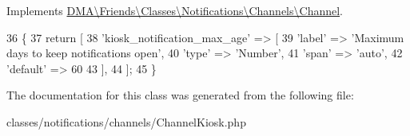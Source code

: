 Implements \hyperlink{interfaceDMA_1_1Friends_1_1Classes_1_1Notifications_1_1Channels_1_1Channel_aa473115fa58a6fa5f57a9069f23dd771}{D\+M\+A\textbackslash{}\+Friends\textbackslash{}\+Classes\textbackslash{}\+Notifications\textbackslash{}\+Channels\textbackslash{}\+Channel}.


\begin{DoxyCode}
36     \{
37         \textcolor{keywordflow}{return} [
38             \textcolor{stringliteral}{'kiosk\_notification\_max\_age'} => [
39                 \textcolor{stringliteral}{'label'} => \textcolor{stringliteral}{'Maximum days to keep notifications open'},
40                 \textcolor{stringliteral}{'type'}  => \textcolor{stringliteral}{'Number'},
41                 \textcolor{stringliteral}{'span'}  => \textcolor{stringliteral}{'auto'},
42                 \textcolor{stringliteral}{'default'} => 60
43             ],
44         ];
45     \}
\end{DoxyCode}


The documentation for this class was generated from the following file\+:\begin{DoxyCompactItemize}
\item 
classes/notifications/channels/Channel\+Kiosk.\+php\end{DoxyCompactItemize}
